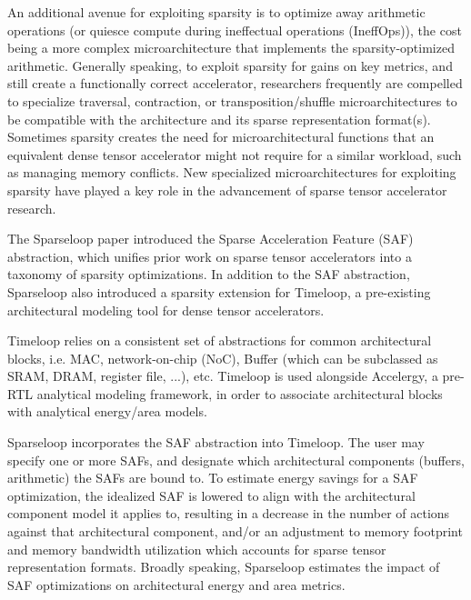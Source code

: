An additional avenue for exploiting sparsity is to optimize away arithmetic operations \cite{eyerissv2} \cite{sparten}\cite{extensor} \cite{sparch} \cite{szebook} \cite{sparseloop} (or quiesce compute during ineffectual operations (IneffOps)\cite{eyeriss}\cite{sparseloop}\cite{szebook}), the cost being a more complex microarchitecture that implements the sparsity-optimized arithmetic\cite{eyeriss}\cite{eyerissv2}. Generally speaking, to exploit sparsity for gains on key metrics, and still create a functionally correct accelerator, researchers frequently are compelled to specialize traversal\cite{szebook}\cite{extensor}, contraction\cite{gamma}\cite{eyerissv2}\cite{extensor}\cite{sparten}, or transposition/shuffle\cite{gamma} microarchitectures to be compatible with the architecture and its sparse representation format(s). Sometimes sparsity creates the need for microarchitectural functions that an equivalent dense tensor accelerator might not require for a similar workload, such as managing memory conflicts\cite{scnn}\cite{sparten}. New specialized microarchitectures for exploiting sparsity have played a key role in the advancement of sparse tensor accelerator research\cite{gamma}\cite{outerspace}\cite{extensor}\cite{sparch}\cite{outerspace}\cite{ampere}.

The Sparseloop\cite{sparseloop} paper introduced the Sparse Acceleration Feature (SAF) abstraction, which unifies prior work on sparse tensor accelerators into a taxonomy of sparsity optimizations. In addition to the SAF abstraction, Sparseloop\cite{sparseloop} also introduced a sparsity extension for Timeloop\cite{timeloop}, a pre-existing architectural modeling tool for dense tensor accelerators. 

Timeloop relies on a consistent set of abstractions for common architectural blocks, i.e. MAC, network-on-chip (NoC), Buffer (which can be subclassed as SRAM, DRAM, register file, ...), etc. Timeloop is used alongside Accelergy\cite{accelergy}, a pre-RTL analytical modeling framework, in order to associate architectural blocks with analytical energy/area models. 

Sparseloop incorporates the SAF abstraction into Timeloop\cite{sparseloop}. The user may specify one or more SAFs, and designate which architectural components (buffers, arithmetic) the SAFs are bound to. To estimate energy savings for a SAF optimization, the idealized SAF is lowered to align with the architectural component model it applies to, resulting in a decrease in the number of actions against that architectural component, and/or an adjustment to memory footprint and memory bandwidth utilization which accounts for sparse tensor representation formats. Broadly speaking, Sparseloop estimates the impact of SAF optimizations on architectural energy and area metrics.

